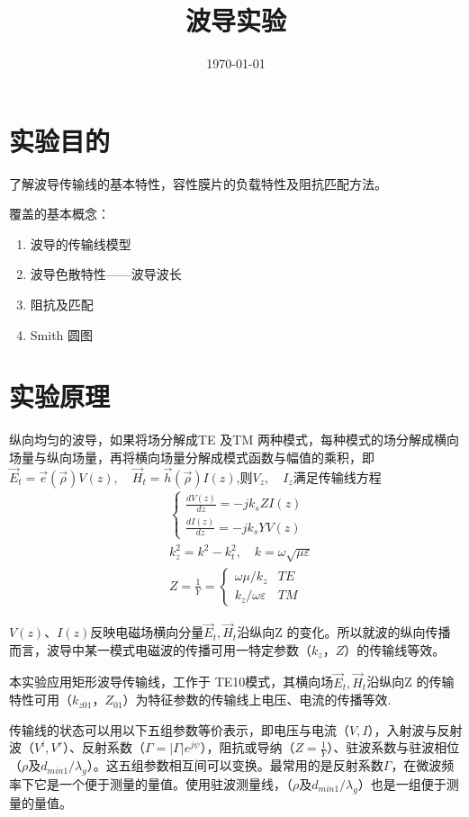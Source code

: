 \documentclass{../source/zjureport}
\title{波导实验}
\date{\today}
\begin{document}
    \makecover
    \makeheader

    \section{实验目的}
    了解波导传输线的基本特性，容性膜片的负载特性及阻抗匹配方法。

    覆盖的基本概念：
    \begin{enumerate}
        \item 波导的传输线模型
        \item 波导色散特性——波导波长
        \item 阻抗及匹配
        \item Smith 圆图
    \end{enumerate}

    \section{实验原理}

    纵向均匀的波导，如果将场分解成TE 及TM 两种模式，每种模式的场分解成横向场量与纵向场量，再将横向场量分解成模式函数与幅值的乘积，即$\vec{E}_{t}=\vec{e}(\vec{\rho}) V(z), \quad \vec{H}_{t}=\vec{h}(\vec{\rho}) I(z)$,则$V_{z},\quad I_{z}$满足传输线方程
    $$
\begin{aligned}
&\left\{\begin{array}{l}
\frac{d V(z)}{d z}=-j k_{s} Z I(z) \\
\frac{d I(z)}{d z}=-j k_{s} Y V(z)
\end{array}\right.\\
&k_{z}^{2}=k^{2}-k_{t}^{2}, \quad k=\omega \sqrt{\mu \varepsilon}\\
&Z=\frac{1}{Y}=\left\{\begin{array}{ll}
\omega \mu / k_{z} & T E \\
k_{z} / \omega \varepsilon & T M
\end{array}\right.
\end{aligned}
$$

$V(z)、I(z)$反映电磁场横向分量$\vec{E}_{t},\vec{H}_t$沿纵向Z 的变化。所以就波的纵向传播而言，波导中某一模式电磁波的传播可用一特定参数（$k_z，Z$）的传输线等效。

本实验应用矩形波导传输线，工作于 TE10模式，其横向场$\vec{E}_{t},\vec{H}_t$沿纵向Z
的传输特性可用（$k_{z01}，Z_{01}$）为特征参数的传输线上电压、电流的传播等效.

传输线的状态可以用以下五组参数等价表示，即电压与电流（$V,I$），入射波与反射波（$V^i,V^r$）、反射系数（$\Gamma=|\Gamma| e^{j \psi}$），阻抗或导纳（$Z = \frac{1}{Y}$）、驻波系数与驻波相位（$\rho$及$d_{min1}/\lambda_g$）。这五组参数相互间可以变换。最常用的是反射系数$\Gamma$，在微波频率下它是一个便于测量的量值。使用驻波测量线，（$\rho$及$d_{min1}/\lambda_g$）也是一组便于测量的量值。
\end{document}

